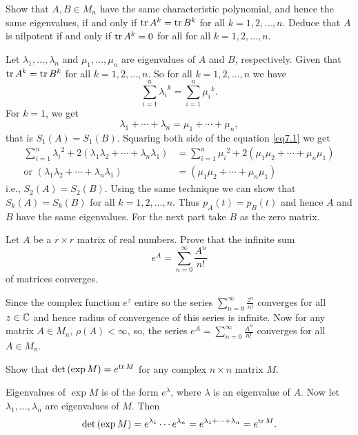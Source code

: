 \question Show that $A, B\in M_n$ have the same characteristic polynomial, and hence the same eigenvalues, if and only if $\operatorname{tr}{A^k}=\operatorname{tr}{B^k}$ for all $k=1, 2, \ldots, n$. Deduce that $A$ is nilpotent if and only if $\operatorname{tr}{A^k}=0$ for all for all $k=1, 2, \ldots, n$.

\begin{solution}
    Let $\lambda_1, \ldots, \lambda_n$ and $\mu_1, \ldots, \mu_n$ are eigenvalues of $A$ and $B$, respectively. Given that $\operatorname{tr}{A^k}=\operatorname{tr}{B^k}$ for all $k=1, 2, \ldots, n$. So for all $k=1, 2, \ldots, n$ we have
    \begin{equation}\label{eq7.0}
        \sum_{i=1}^{n}{{\lambda_i}^k}=\sum_{i=1}^{n}{{\mu_i}^k}.
    \end{equation}
    For $k=1$, we get 
    \begin{equation}\label{eq7.1}
        \lambda_1+\cdots+\lambda_n=\mu_1+\cdots+\mu_n,
    \end{equation}
    that is $S_1(A)=S_1(B)$. Squaring both side of the equation \ref{eq7.1} we get 
    \begin{align*}
        \sum_{i=1}^{n}{{\lambda_i}^2}+2(\lambda_1\lambda_2+\cdots+\lambda_n\lambda_1)&=\sum_{i=1}^{n}{{\mu_i}^2}+2(\mu_1\mu_2+\cdots+\mu_n\mu_1)\\
        \text{or}\,\,(\lambda_1\lambda_2+\cdots+\lambda_n\lambda_1)&=(\mu_1\mu_2+\cdots+\mu_n\mu_1)
    \end{align*}
    i.e., $S_2(A)=S_2(B)$. Using the same technique we can show that $S_k(A)=S_k(B)$ for all $k=1, 2, \ldots, n$. Thus $p_A(t)=p_B(t)$ and hence $A$ and $B$ have the same eigenvalues. For the next part take $B$ as the zero matrix.
\end{solution}

\question Let $A$ be a $r\times r$ matrix of real numbers. Prove that the infinite sum $$e^A=\sum_{n=0}^{\infty}{\frac{A^n}{n!}}$$ of matrices converges.

\begin{solution}
    Since the complex function $e^z$ entire so the series $\sum_{n=0}^{\infty}{\frac{z^n}{n!}}$ converges for all $z\in\mathbb{C}$ and hence radius of convergence of this series is infinite. Now for any matrix $A\in M_n$, $\rho(A)<\infty$, so, the series $e^A=\sum_{n=0}^{\infty}{\frac{A^n}{n!}}$ converges for all $A\in M_n$.
\end{solution}

\question Show that $\det{(\exp{M})}=e^{\operatorname{tr}{M}}$ for any complex $n\times n$ matrix $M$.

\begin{solution}
    Eigenvalues of $\exp{M}$ is of the form $e^{\lambda}$, where $\lambda$ is an eigenvalue of $A$. Now let $\lambda_1, \ldots, \lambda_n$ are eigenvalues of $M$. Then 
    $$\det{(\exp{M})}=e^{\lambda_1}\cdots e^{\lambda_n}=e^{\lambda_1+\cdots+\lambda_n}=e^{\operatorname{tr}{M}}.$$
\end{solution}


